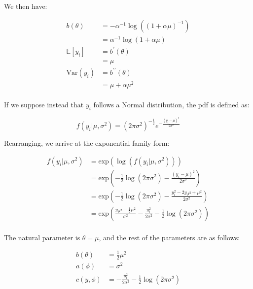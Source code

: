 \documentclass{report}
\begin{document}
We then have:

\begin{equation}\label{eq:ex-glm-nb-dist-alpha-parameterization-mean-var}
    \begin{aligned}
      b(\theta)
        &= -\alpha^{-1}\log\left((1+\alpha\mu)^{-1}\right) \\
        &= \alpha^{-1}\log(1+\alpha\mu) \\
      \mathbb{E}[y_i]
        &= b^\prime(\theta) \\
        &= \mu \\
      \text{Var}(y_i)
        &= b^{\prime\prime}(\theta) \\
        &= \mu + \alpha\mu^2 \\
    \end{aligned}
\end{equation}

If we suppose instead that $y_i$ follows a Normal distribution, the \gls{pdf} is defined as:

\begin{equation}\label{eq:ex-glm-normal-dist}
    f(y_i|\mu, \sigma^2) = (2\pi\sigma^2)^{-\frac{1}{2}} e^{-\frac{(y_i - \mu)^2}{2\sigma^2}}
\end{equation}

Rearranging, we arrive at the exponential family form:

\begin{equation}\label{eq:ex-glm-normal-dist-exp-form}
    \begin{aligned}
        f(y_i|\mu, \sigma^2) 
          &= \text{exp}(\log(f(y_i|\mu, \sigma^2))) \\
          &= \text{exp}\left(-\frac{1}{2}\log(2\pi\sigma^2) - \frac{(y_i - \mu)^2}{2\sigma^2}\right) \\
          &= \text{exp}\left(-\frac{1}{2}\log(2\pi\sigma^2) - \frac{y_i^2 - 2y_i\mu + \mu^2}{2\sigma^2}\right) \\
          &= \text{exp}\left(\frac{y_i\mu - \frac{1}{2}\mu^2}{\sigma^2} - \frac{y_i^2}{2\sigma^2} - \frac{1}{2}\log(2\pi\sigma^2)\right) \\
    \end{aligned}
\end{equation}

The natural parameter is $\theta = \mu$, and the rest of the parameters are as follows:

\begin{equation}\label{eq:ex-glm-normal-dist-params}
    \begin{aligned}
        b(\theta) &= \frac{1}{2}\mu^2 \\
        a(\phi) &= \sigma^2 \\
        c(y, \phi) &= - \frac{y_i^2}{2\sigma^2} - \frac{1}{2}\log(2\pi\sigma^2) \\
    \end{aligned}
\end{equation}
\end{document}
